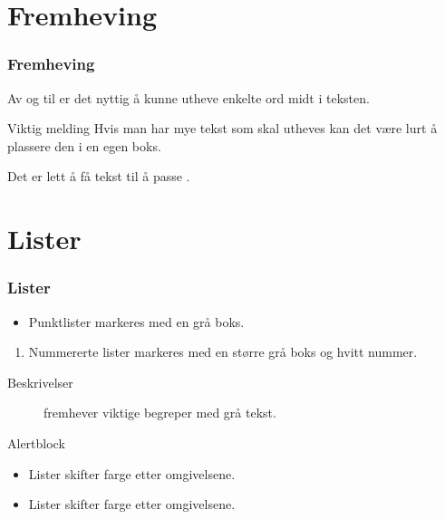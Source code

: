 \documentclass[norsk]{beamer}
\begin{document}
\section{Fremheving}


\begin{frame}
    \frametitle{Fremheving}

    Av og til er det nyttig å kunne \alert{utheve} enkelte ord midt i teksten.

    \begin{alertblock}{Viktig melding}
        Hvis man har mye tekst som skal \alert{utheves} kan det være lurt å plassere den i en egen boks.
    \end{alertblock}

    Det er lett å få tekst til å passe .
\end{frame}


\section{Lister}


\begin{frame}
    \frametitle{Lister}

    \begin{itemize}
        \item
        Punktlister markeres med en grå boks.
    \end{itemize}

    \begin{enumerate}
        \item
        Nummererte lister markeres med en større grå boks og hvitt nummer.
    \end{enumerate}

    \begin{description}
        \item[Beskrivelser]
        fremhever viktige begreper med grå tekst.
    \end{description}

    \begin{alertblock}{Alertblock}
        \begin{itemize}
            \item
            Lister skifter farge etter omgivelsene.
        \end{itemize}
    \end{alertblock}

    \begin{example}
        \begin{itemize}
            \item
            Lister skifter farge etter omgivelsene.
        \end{itemize}
    \end{example}
\end{frame}
\end{document}
